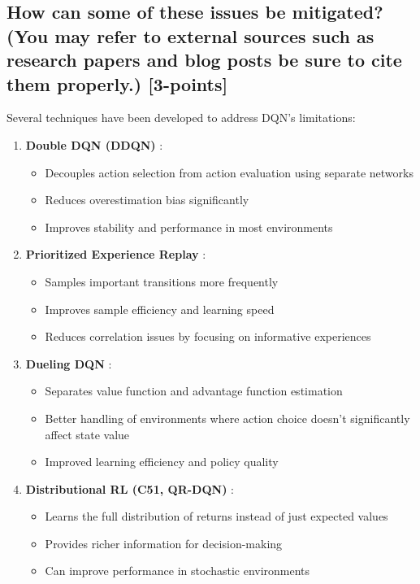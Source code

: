 \documentclass[12pt]{article}
\begin{document}
{{{\subsection{How can some of these issues be mitigated? (You may refer to external sources such as research papers and blog posts be sure to cite them properly.) [3-points]}

Several techniques have been developed to address DQN's limitations:

\begin{enumerate}
    \item \textbf{Double DQN (DDQN)} \cite{van2016deep}:
    \begin{itemize}
        \item Decouples action selection from action evaluation using separate networks
        \item Reduces overestimation bias significantly
        \item Improves stability and performance in most environments
    \end{itemize}
    
    \item \textbf{Prioritized Experience Replay} \cite{schaul2015prioritized}:
    \begin{itemize}
        \item Samples important transitions more frequently
        \item Improves sample efficiency and learning speed
        \item Reduces correlation issues by focusing on informative experiences
    \end{itemize}
    
    \item \textbf{Dueling DQN} \cite{wang2016dueling}:
    \begin{itemize}
        \item Separates value function and advantage function estimation
        \item Better handling of environments where action choice doesn't significantly affect state value
        \item Improved learning efficiency and policy quality
    \end{itemize}
    
    \item \textbf{Distributional RL (C51, QR-DQN)} \cite{bellemare2017distributional}:
    \begin{itemize}
        \item Learns the full distribution of returns instead of just expected values
        \item Provides richer information for decision-making
        \item Can improve performance in stochastic environments
    \end{itemize}
    

\end{enumerate}}}}
\end{document}
